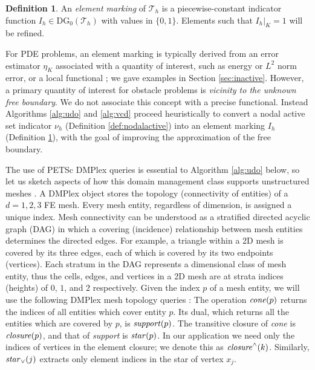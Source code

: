 \documentclass[]{interact}
\theoremstyle{plain}%
\theoremstyle{definition}
\newtheorem{definition}[theorem]{Definition}
\theoremstyle{remark}
\newcommand{\cT}{\mathcal{T}}
\newcommand{\DG}{\text{DG}}
\begin{document}
\begin{definition} \label{def:marking}
An \emph{element marking} of $\cT_h$ is a piecewise-constant indicator function $I_h \in \DG_0(\cT_h)$ with values in $\{0,1\}$.  Elements such that $I_h|_K=1$ will be refined.
\end{definition}

For PDE problems, an element marking is typically derived from an error estimator $\eta_K$ associated with a quantity of interest, such as energy or $L^2$ norm error, or a local functional \cite{BangerthRannacher2003}; we gave examples in Section \ref{sec:inactive}.  However, a primary quantity of interest for obstacle problems is \emph{vicinity to the unknown free boundary}.  We do not associate this concept with a precise functional.  Instead Algorithms \ref{alg:udo} and \ref{alg:vcd} proceed heuristically to convert a nodal active set indicator $\nu_h$ (Definition \ref{def:nodalactive}) into an element marking $I_h$ (Definition \ref{def:marking}), with the goal of improving the approximation of the free boundary.

The use of PETSc DMPlex queries is essential to Algorithm \ref{alg:udo} below, so let us sketch aspects of how this domain management class supports unstructured meshes \cite{Langeetal2016}.  A DMPlex object stores the topology (connectivity of entities) of a $d=1,2,3$ FE mesh.  Every mesh entity, regardless of dimension, is assigned a unique index.  Mesh connectivity can be understood as a stratified directed acyclic graph (DAG) in which a covering (incidence) relationship between mesh entities determines the directed edges.  For example, a triangle within a 2D mesh is covered by its three edges, each of which is covered by its two endpoints (vertices).  Each stratum in the DAG represents a dimensional class of mesh entity, thus the cells, edges, and vertices in a 2D mesh are at strata indices (heights) of $0$, $1$, and $2$ respectively.  Given the index $p$ of a mesh entity, we will use the following DMPlex mesh topology queries \cite{petsc-user-ref}:  The operation $\text{\emph{cone}}(p)$ returns the indices of all entities which cover entity $p$.  Its dual, which returns all the entities which are covered by $p$, is $\text{\emph{support}}(p)$.  The transitive closure of \emph{cone} is $\text{\emph{closure}}(p)$, and that of \emph{support} is $\text{\emph{star}}(p)$.  In our application we need only the indices of vertices in the element closure; we denote this as $\text{\emph{closure}}^\wedge(k)$.  Similarly, $\text{\emph{star}}_\vee(j)$ extracts only element indices in the star of vertex $x_j$.
\end{document}
